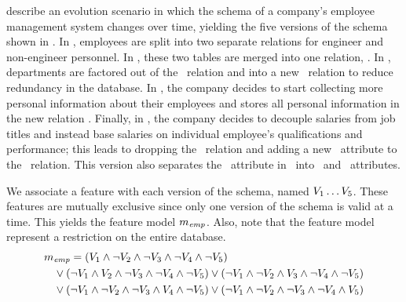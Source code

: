 

\citet{prima08Moon} describe an evolution scenario in which the schema of a
company's employee management system changes over time, yielding the five
versions of the schema shown in .
%
In \vOne, employees are split into two separate relations for
engineer and non-engineer personnel.
%
In \vTwo, these two tables are merged into one relation, \empacct.
%
In \vThree, departments are factored out of the \empacct\ relation and
into a new \dept\ relation to reduce redundancy in the database.
%
In \vFour, the company decides to start collecting more personal
information about their employees and stores all personal information in the
new relation \empbio.
%
Finally, in \vFive, the company decides to decouple salaries from
job titles and instead base salaries on individual employee's qualifications
and performance; this leads to dropping the \job\ relation and adding a new
\salary\ attribute to the \empacct\ relation. This version also separates the
\name\ attribute in \empbio\ into \fname\ and \lname\ attributes.


We associate a feature with each version of the schema, named 
$\vOne\ldots\vFive$.
%
These features are mutually exclusive since only one version of the
schema is valid at a time. This yields the  feature model
$\fModel_\employee$.
%
 Also, note that the feature model represent a restriction on the entire
 database.
%
\begin{align*}
\fModel_\employee
  &=   \left(\vOne\wedge\neg\vTwo\wedge\neg\vThree\wedge\neg\vFour\wedge\neg\vFive\right)\\
  &\hspace{-15pt} \vee\left(\neg\vOne\wedge\vTwo\wedge\neg\vThree\wedge\neg\vFour\wedge\neg\vFive\right)
  \vee\left(\neg\vOne\wedge\neg\vTwo\wedge\vThree\wedge\neg\vFour\wedge\neg\vFive\right)\\
   &\hspace{-15pt} \vee\left(\neg\vOne\wedge\neg\vTwo\wedge\neg\vThree\wedge\vFour\wedge\neg\vFive\right)
  \vee\left(\neg\vOne\wedge\neg\vTwo\wedge\neg\vThree\wedge\neg\vFour\wedge\vFive\right)
\end{align*}



